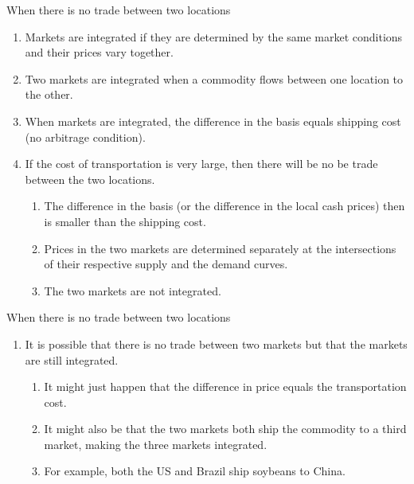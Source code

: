 \documentclass[table,xcolor=pdftex,dvipsnames]{beamer}\usepackage[]{graphicx}\usepackage[]{color}
\begin{document}
\begin{frame}{When there is no trade between two locations}
\begin{enumerate}[label=\textbullet]
    \item Markets are integrated if they are determined by the same market conditions and their prices vary together.
    \item Two markets are integrated when a commodity flows between one location to the other. 
    \item When markets are integrated, the difference in the basis equals shipping cost (no arbitrage condition).
    \item If the cost of transportation is very large, then there will be no be trade between the two locations. 
      \begin{enumerate}[label=-]
          \item The difference in the basis (or the difference in the local cash prices) then is smaller than the shipping cost.
          \item Prices in the two markets are determined separately at the intersections of their respective supply and the demand curves.
          \item The two markets are not integrated.
      \end{enumerate}
\end{enumerate}
\end{frame}


\begin{frame}{When there is no trade between two locations}
\begin{enumerate}[label=\textbullet]
    \item It is possible that there is no trade between two markets but that the markets are still integrated.
        \begin{enumerate}[label=-]
          \item It might just happen that the difference in price equals the transportation cost.
          \item It might also be that the two markets both ship the commodity to a third market, making the three markets integrated.
          \item For example, both the US and Brazil ship soybeans to China.
        \end{enumerate}
\end{enumerate}
\end{frame}
\end{document}

